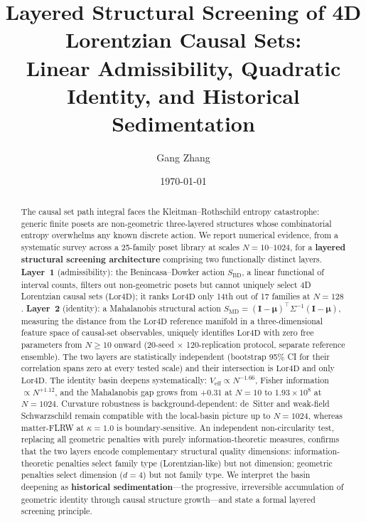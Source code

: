 \documentclass[12pt,a4paper]{article}
\title{Layered Structural Screening of 4D Lorentzian Causal Sets:\\
  Linear Admissibility, Quadratic Identity, and Historical Sedimentation}
\author{Gang Zhang}
\date{\today}
\newcommand{\SBD}{S_{\mathrm{BD}}}
\newcommand{\SMD}{S_{\mathrm{MD}}}
\newcommand{\Lor}{\mathrm{Lor4D}}
\newcommand{\Veff}{V_{\mathrm{eff}}}
\begin{document}
\maketitle

\begin{abstract}
The causal set path integral faces the Kleitman--Rothschild entropy catastrophe:
generic finite posets are non-geometric three-layered structures whose combinatorial
entropy overwhelms any known discrete action.
We report numerical evidence, from a systematic survey across a 25-family poset
library at scales $N=10$--$1024$, for a \textbf{layered structural screening
architecture} comprising two functionally distinct layers.
\textbf{Layer~1} (admissibility): the Benincasa--Dowker action $\SBD$, a linear
functional of interval counts, filters out non-geometric posets but cannot uniquely
select 4D Lorentzian causal sets ($\Lor$); it ranks $\Lor$ only 14th out of 17
families at $N=128$.
\textbf{Layer~2} (identity): a Mahalanobis structural action
$\SMD = (\mathbf{I}-\bm{\mu})^\top \Sigma^{-1}(\mathbf{I}-\bm{\mu})$,
measuring the distance from the $\Lor$ reference manifold in a three-dimensional
feature space of causal-set observables, uniquely identifies $\Lor$ with zero free
parameters from $N\geq 10$ onward (20-seed $\times$ 120-replication protocol,
separate reference ensemble).
The two layers are statistically independent (bootstrap 95\% CI for their
correlation spans zero at every tested scale) and their intersection is $\Lor$
and only $\Lor$.
The identity basin deepens systematically:
$\Veff \propto N^{-1.66}$, Fisher information $\propto N^{+1.12}$,
and the Mahalanobis gap grows from $+0.31$ at $N=10$ to $1.93\times 10^8$
at $N=1024$.
Curvature robustness is background-dependent: de~Sitter and weak-field
Schwarzschild remain compatible with the local-basin picture up to $N=1024$,
whereas matter-FLRW at $\kappa=1.0$ is boundary-sensitive.
An independent non-circularity test, replacing all geometric penalties with
purely information-theoretic measures, confirms that the two layers encode
complementary structural quality dimensions: information-theoretic penalties
select family type (Lorentzian-like) but not dimension; geometric penalties
select dimension ($d=4$) but not family type.
We interpret the basin deepening as \textbf{historical sedimentation}---the
progressive, irreversible accumulation of geometric identity through causal
structure growth---and state a formal layered screening principle.
\end{abstract}
\end{document}
